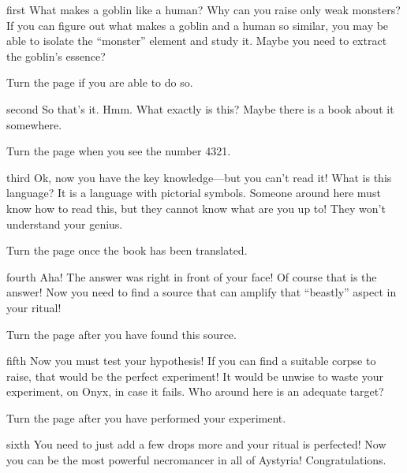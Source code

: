 \documentclass[notebook]{guildcamp2} %
\begin{document}
\startnotebook{\nraisemonster{}}

\begin{page}{first}
What makes a goblin like a human? Why can you raise only weak monsters? If you can figure out what makes a goblin and a human so similar, you may be able to isolate the ``monster'' element and study it. Maybe you need to extract the goblin's essence? 

Turn the page if you are able to do so.
\end{page}

\begin{page}{second}
So that's it. Hmm. What exactly is this? Maybe there is a book about it somewhere. 

Turn the page when you see the number 4321.
\end{page}

\begin{page}{third}
Ok, now you have the key knowledge---but you can't read it! What is this language? It is a language with pictorial symbols. Someone around here must know how to read this, but they cannot know what are you up to! They won't understand your genius.

Turn the page once the book has been translated.
\end{page}

\begin{page}{fourth}
Aha! The answer was right in front of your face! Of course that is the answer! Now you need to find a source that can amplify that ``beastly'' aspect in your ritual!

Turn the page after you have found this source.
\end{page}

\begin{page}{fifth}
Now you must test your hypothesis! If you can find a suitable corpse to raise, that would be the perfect experiment! It would be unwise to waste your experiment, on Onyx, in case it fails. Who around here is an adequate target?

Turn the page after you have performed your experiment.
\end{page}

\begin{page}{sixth}
You need to just add a few drops more and your ritual is perfected! Now you can be the most powerful necromancer in all of Aystyria! Congratulations.
\end{page}

\endnotebook
\end{document}
